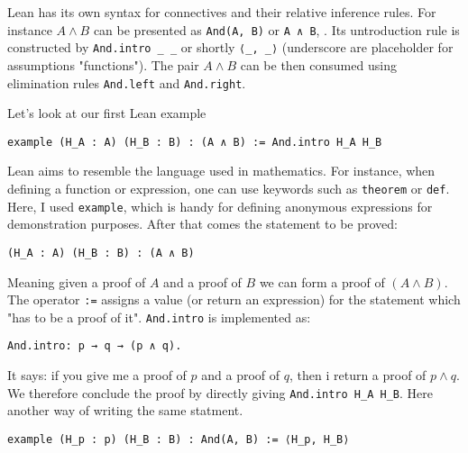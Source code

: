 Lean has its own syntax for connectives and their relative inference rules.
For instance $A \land B$ can be presented as \lstinline[language=lean]|And(A, B)| or \lstinline[language=lean]|A ∧ B|,
. Its untroduction rule is constructed by
 \lstinline[language=lean]|And.intro _ _| or shortly
 \lstinline[language=lean]|⟨_, _⟩| (underscore are placeholder for assumptions "functions"). 
 The pair $A \land B$ can be then consumed using elimination 
rules \lstinline[language=lean]|And.left| and \lstinline[language=lean]|And.right|.
\begin{example}\label{ex:conj_intro}
    Let's look at our first Lean example
  \begin{lstlisting}[language=lean]
    example (H_A : A) (H_B : B) : (A ∧ B) := And.intro H_A H_B
  \end{lstlisting}
Lean aims to resemble the language used in mathematics. 
For instance, when defining a function or expression, one can use keywords such as 
\lstinline[language=lean]|theorem| or \lstinline[language=lean]|def|.
Here, I used \lstinline[language=lean]|example|, which is handy for defining anonymous expressions 
for demonstration purposes. 
After that comes the statement to be proved:
\begin{lstlisting}[language=lean]
  (H_A : A) (H_B : B) : (A ∧ B) 
\end{lstlisting}
Meaning given a proof of $A$ and a proof of $B$ we can form a proof of $(A \land B)$.
The operator \lstinline[language=lean]|:=| assigns a value (or return an expression) for the statement which
 "has to be a proof of it".
\lstinline[language=lean]|And.intro| is implemented as:
\begin{lstlisting}[language=lean]
  And.intro: p → q → (p ∧ q).
\end{lstlisting}
It says: if you give me a proof of $p$ and a proof of $q$, 
then i return a proof of $p \land q$.
We therefore conclude the proof by directly giving 
\lstinline[language=lean]|And.intro H_A H_B|.
Here another way of writing the same statment.
\begin{lstlisting}[language=lean]
  example (H_p : p) (H_B : B) : And(A, B) := ⟨H_p, H_B⟩
\end{lstlisting}
\end{example}

